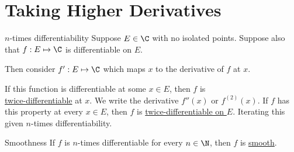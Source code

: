\documentclass[../Main.tex]{subfiles}
\begin{document}
\section{Taking Higher Derivatives}
\begin{definition}{$n$-times differentiability}
    Suppose $E \in \C$ with no isolated points. Suppose also that $f : E \mapsto \C$ is differentiable on $E$.\par
    Then consider $f' : E \mapsto \C$ which maps $x$ to the derivative of $f$ at $x$.\par
    If this function is differentiable at some $x \in E$, then $f$ is \\\underline{twice-differentiable} at $x$. We write the derivative $f''(x)$ or $f^{(2)}(x)$. If $f$ has this property at every $x \in E$, then $f$ is \underline{twice-differentiable on $E$}. Iterating this given $n$-times differentiability.
\end{definition}
\begin{definition}{Smoothness}
    If $f$ is $n$-times differentiable for every $n \in \N$, then $f$ is \underline{smooth}.
\end{definition}
\end{document}
